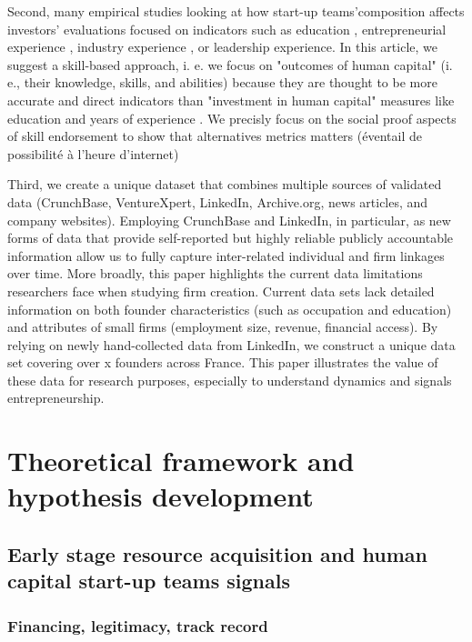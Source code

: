 \documentclass[12pt]{article}
\begin{document}
Second, many empirical studies looking at how start-up teams'composition affects investors' evaluations focused on indicators such as education \citep{franke2008venture}, entrepreneurial experience \citep{beckman2007early}, industry experience \citep{becker2015new}, or leadership experience\citep{hoenig2015quality}. In this article, we suggest a skill-based approach, i. e. we focus on "outcomes of human capital" (i. e., their knowledge, skills, and abilities) because they are thought to be more accurate and direct indicators than "investment in human capital" measures like education and years of experience \citep{unger2011human, marvel2016human}. We precisly focus on the social proof aspects of skill endorsement to show that alternatives metrics matters (éventail de possibilité à l'heure d'internet)

Third, we create a unique dataset that combines multiple sources of validated data (CrunchBase, VentureXpert, LinkedIn, Archive.org, news articles, and company websites). Employing CrunchBase and LinkedIn, in particular, as new forms of data that provide self-reported but highly reliable publicly accountable information allow us to fully capture inter-related individual and firm linkages over time. More broadly, this paper highlights the current data limitations researchers face when studying firm creation. Current data sets lack detailed information on both founder characteristics (such as occupation and education) and attributes of small firms (employment size, revenue, financial access). By relying on newly hand-collected data from LinkedIn, we construct a unique data set covering over x founders across France. This paper illustrates the value of these data for research purposes, especially to understand dynamics and signals entrepreneurship.

\section{Theoretical framework and hypothesis development}

\subsection{Early stage resource acquisition and human capital start-up teams signals}

\subsubsection{Financing, legitimacy, track record}
\end{document}
